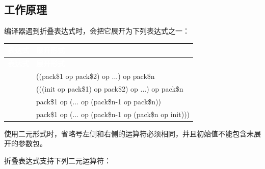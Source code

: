 
\subsection{工作原理}



编译器遇到折叠表达式时，会把它展开为下列表达式之一：



\myTableBegin
\begin{xltabular}{\textwidth}{|>{\hsize\raggedright\arraybackslash}X|>{\hsize\raggedright\arraybackslash}X|}
\hline
{} \textcolor{white}{\textbf{表达式}} & \textcolor{white}{\textbf{展开形式}} \\
\hline
\endfirsthead
{} \textcolor{white}{\textbf{表达式}} & \textcolor{white}{\textbf{展开形式}} \\
\hline
\endhead
{} & ((pack\$1 op pack\$2) op ...) op pack\$n \\
\hline
{} & (((init op pack\$1) op pack\$2) op ...) op pack\$n \\
\hline
{} & pack\$1 op (... op (pack\$n-1 op pack\$n)) \\
\hline
{} & pack\$1 op (... op (pack\$n-1 op (pack\$n op init))) \\
\hline
\end{xltabular}
\myTableEnd



使用二元形式时，省略号左侧和右侧的运算符必须相同，并且初始值不能包含未展开的参数包。



折叠表达式支持下列二元运算符：



